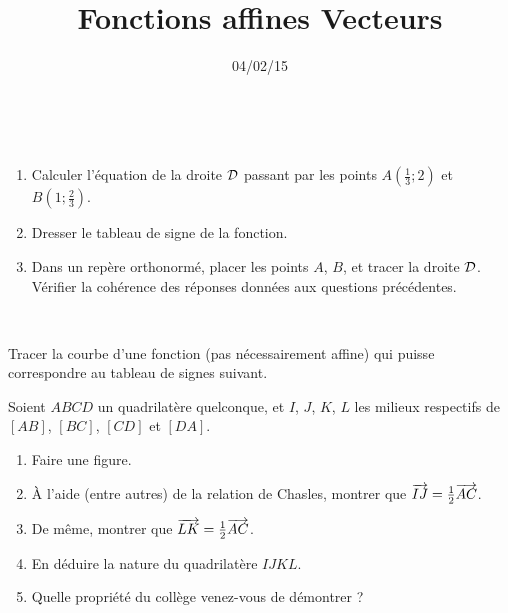 \documentclass[12pt]{article}
\title{Fonctions affines Vecteurs}
\date{04/02/15}
\begin{document}
\maketitle

\begin{exercice}~
  \begin{enumerate}
    \item Calculer l'équation de la droite $\cal D$ passant par les points $A(\frac{1}{3}; 2)$ et $B(1; \frac{2}{3})$.
    \item Dresser le tableau de signe de la fonction.
    \item Dans un repère orthonormé, placer les points $A$, $B$, et tracer la droite $\cal D$. Vérifier la cohérence des réponses données aux questions précédentes.
  \end{enumerate}
\end{exercice}

\begin{exercice}~

  Tracer la courbe d'une fonction (pas nécessairement affine) qui puisse correspondre au tableau de signes suivant.

      \begin{center}
      \end{center}
\end{exercice}

\begin{exercice}[Vecteurs]
  Soient $ABCD$ un quadrilatère quelconque, et $I$, $J$, $K$, $L$ les milieux respectifs de $[AB]$, $\left[ BC \right]$, $\left[ CD \right]$ et $\left[ DA \right]$.

  \begin{enumerate}
    \item Faire une figure.
    \item À l'aide (entre autres) de la relation de Chasles, montrer que $\overrightarrow{IJ}=\frac{1}{2}\overrightarrow{AC}$.
    \item De même, montrer que $\overrightarrow{LK}=\frac{1}{2}\overrightarrow{AC}$.
    \item En déduire la nature du quadrilatère $IJKL$.
    \item Quelle propriété du collège venez-vous de démontrer ?
  \end{enumerate}
  

\end{exercice}
\end{document}
